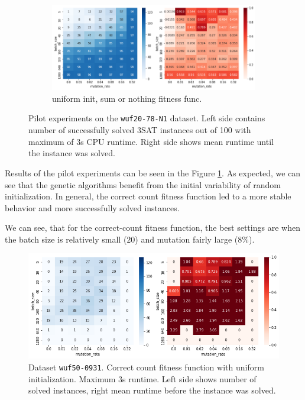 \documentclass[a4paper,10pt]{article}
\begin{document}
\begin{figure}[!htb]
\begin{subfigure}{.49\linewidth}
    \includegraphics[width=\linewidth]{images/pilot_uniform_sum_or_nothing.png}
    \caption{uniform init, sum or nothing fitness func.}
\end{subfigure}        
\caption{Pilot experiments on the \lstinline{wuf20-78-N1} dataset. Left side contains number of successfully solved 3SAT instances out of 100 with maximum of 3s CPU runtime. Right side shows mean runtime until the instance was solved.}
\label{fig:small:pilot}
\end{figure}

Results of the pilot experiments can be seen in the Figure \ref{fig:small:pilot}. As expected, we can see that the genetic algorithms benefit from the initial variability of random initialization. In general, the correct count fitness function led to a more stable behavior and more successfully solved instances.

We can see, that for the correct-count fitness function, the best settings are when the batch size is relatively small ($20$) and mutation fairly large ($8\%$).

\begin{figure}[!htb]
    \includegraphics[width=\linewidth]{images/pilot_medium_uniform_correct_count.png}
    \caption{Dataset \lstinline{wuf50-0931}. Correct count fitness function with uniform initialization. Maximum 3s runtime. Left side shows number of solved instances, right mean runtime before the instance was solved.}
    \label{fig:pilot:mid}
\end{figure}
\end{document}
